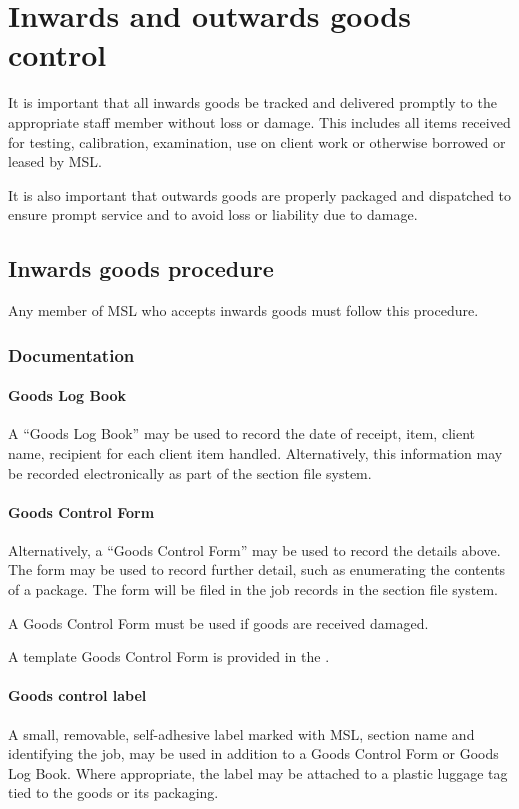 \section{Inwards and outwards goods control}
\label{s:inwards_outwards_goods}
It is important that all inwards goods be tracked and delivered promptly to the appropriate staff member without loss or damage. This includes all items received for testing, calibration, examination, use on client work or otherwise borrowed or leased by MSL.

It is also important that outwards goods are properly packaged and dispatched to ensure prompt service and to avoid loss or liability due to damage.

\subsection{Inwards goods procedure}
Any member of MSL who accepts inwards goods must follow this procedure.

\subsubsection{Documentation}
\paragraph{Goods Log Book}
A ``Goods Log Book'' may be used to record the date of receipt, item, client name, recipient for each client item handled. Alternatively, this information may be recorded electronically as part of the section file system.

\paragraph{Goods Control Form}
Alternatively, a ``Goods Control Form'' may be used to record the details above.  The form may be used to record further detail, such as enumerating the contents of a package. The form will be filed in the job records in the section file system. 

A Goods Control Form must be used if goods are received damaged.

A template Goods Control Form is provided in the .

\paragraph{Goods control label}
A small, removable, self-adhesive label marked with MSL, section name and identifying the job, may be used in addition to a Goods Control Form or Goods Log Book. Where appropriate, the label may be attached to a plastic luggage tag tied to the goods or its packaging.

